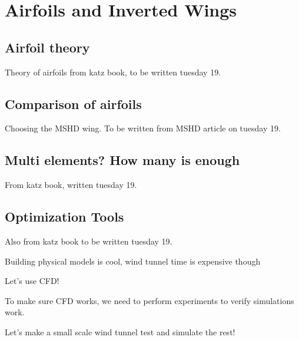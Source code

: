 \chapter{Airfoils and Inverted Wings}

\section{Airfoil theory}
Theory of airfoils from katz book, to be written tuesday 19.

\section{Comparison of airfoils}
Choosing the MSHD wing.
To be written from MSHD article on tuesday 19.

\section{Multi elements? How many is enough}
From katz book, written tuesday 19.

\section{Optimization Tools}

Also from katz book to be written tuesday 19.

Building physical models is cool, wind tunnel time is expensive though

Let's use CFD!

To make sure CFD works, we need to perform experiments to verify simulations work.

Let's make a small scale wind tunnel test and simulate the rest!
